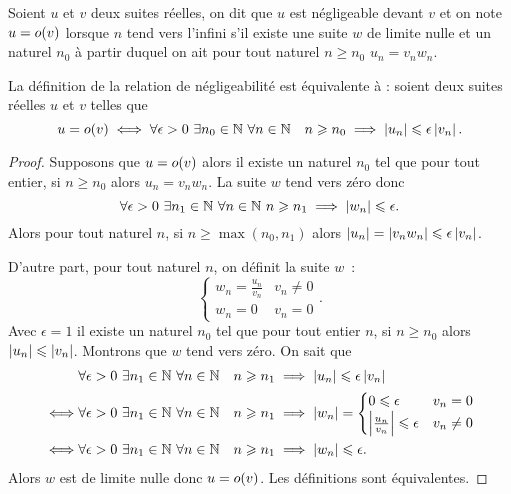 \begin{defdef}
    Soient \(u\) et \(v\) deux suites réelles, on dit que \(u\) est négligeable
    devant \(v\) et on note \(u = o\mathopen{}\left(v\right)\) lorsque \(n\) tend vers l'infini
    s'il existe une suite \(w\) de limite nulle et un naturel \(n_0\) à partir
    duquel on ait pour tout naturel \(n \geqslant n_0\) \(u_n = v_n w_n\).
\end{defdef}
\begin{prop}
    La définition de la relation de négligeabilité est équivalente à : soient deux
    suites réelles \(u\) et \(v\) telles que
    \begin{equation}
        u = o\mathopen{}\left(v\right) \iff \forall \epsilon > 0 \ \exists n_0 \in \mathbb{N} \ \forall n
        \in \mathbb{N} \quad n \geqslant n_0 \implies \left\lvert u_n\right\rvert \leqslant \epsilon
        \left\lvert v_n\right\rvert.
    \end{equation}
\end{prop}
\begin{proof}
    Supposons que \(u = o\mathopen{}\left(v\right)\) alors il existe un naturel \(n_0\) tel que
    pour tout entier, si \(n \geqslant n_0\) alors \(u_n = v_n w_n\). La suite
    \(w\) tend vers zéro donc
    \begin{equation}
        \forall \epsilon > 0 \ \exists n_1 \in \mathbb{N} \ \forall n \in \mathbb{N} \ n \geqslant
        n_1 \implies \left\lvert w_n\right\rvert \leqslant \epsilon.
    \end{equation}
    Alors pour tout naturel \(n\), si \(n \geqslant \max(n_0, n_1)\) alors
    \(\left\lvert u_n\right\rvert = \left\lvert v_n w_n\right\rvert \leqslant \epsilon \left\lvert v_n\right\rvert\).

    D'autre part, pour tout naturel \(n\), on définit la suite \(w\)~:
    \begin{equation}
        \begin{cases}
            w_n = \frac{u_n}{v_n} & v_n \neq 0 \\ w_n = 0 & v_n = 0
        \end{cases}.
    \end{equation}
    Avec \(\epsilon = 1\) il existe un naturel \(n_0\) tel que pour tout entier
    \(n\), si \(n \geqslant n_0\) alors \(\left\lvert u_n\right\rvert \leqslant \left\lvert v_n\right\rvert\).
    Montrons que \(w\) tend vers zéro. On sait que
    \begin{align}
        & \forall \epsilon > 0 \ \exists n_1 \in \N \ \forall n \in \N \quad n
        \geqslant n_1 \implies \abs{u_n} \leqslant \epsilon \abs{v_n} \\ \iff &
        \forall \epsilon > 0 \ \exists n_1 \in \N \ \forall n \in \N \quad n
        \geqslant n_1 \implies \abs{w_n}= \begin{cases} 0 \leqslant \epsilon & v_n
        = 0 \\ \abs{\frac{u_n}{v_n}} \leqslant \epsilon & v_n\neq 0 \end{cases} \\
        \iff & \forall \epsilon > 0 \ \exists n_1 \in \N \ \forall n \in \N
        \quad n \geqslant n_1 \implies \abs{w_n} \leqslant \epsilon.
    \end{align}
    Alors \(w\) est de limite nulle donc \(u = o\mathopen{}\left(v\right)\). Les définitions
    sont équivalentes.
\end{proof}
